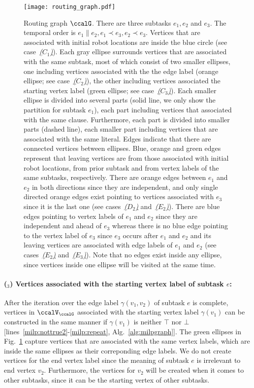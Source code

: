 \documentclass[Afour,sageh,times]{sagej}
\newcounter{mycounter}
\begin{document}
\begin{figure}[!t]
  \centering
  \texttt{[image: routing\_graph.pdf]}
  \caption{Routing graph $\ccalG$. There are three subtasks $e_1, e_2$ and $e_3$. The temporal order is $e_1 \| e_2, e_1 \prec e_3, e_2 \prec e_3$.    Vertices that are associated with initial robot locations are inside the blue circle (see case~\hyperref[vertex:initial]{\it ($C_1$)}). Each gray ellipse surrounds vertices that are associated with the same subtask, most of which consist of two smaller ellipses, one including vertices associated with the the edge label (orange ellipse; see case~\hyperref[vertex:edge]{\it ($C_2$)}), the other including vertices associated the starting vertex label (green ellipse; see case~\hyperref[vertex:vertex]{\it ($C_3$)}).  Each smaller ellipse is divided into several parts (solid line, we only show the partition for subtask $e_1$), each part including vertices that associated with the same clause. Furthermore, each part is divided into smaller parts (dashed line), each smaller part including vertices that are associated with the same literal.
    Edges indicate that there are connected vertices between  ellipses. Blue, orange and green  edges represent that leaving vertices are from those associated with initial robot locations, from  prior subtask and from vertex labels of the same subtasks, respectively. There are orange edges between $e_1$ and $e_2$ in both directions since they are independent, and only single directed orange edges exist pointing to vertices associated with $e_3$ since it is the last one {(see cases~\hyperref[sec:b]{\it ($D_2$)} and~\hyperref[edge:vertex2]{\it ($E_2$)})}. There are blue edges pointing to vertex labels of $e_1$ and $e_2$ since they are independent and ahead of $e_3$  whereas there is no blue edge pointing to the vertex label of $e_3$ since $e_3$ occurs after $e_1$ and $e_2$ and its leaving vertices are associated with  edge labels of $e_1$ and $e_2$ (see cases~\hyperref[edge:vertex2]{\it ($E_2$)} and~\hyperref[edge:vertex3]{\it ($E_3$)}).  Note that no edges exist inside any ellipse, since vertices inside one ellipse will be visited at the same time.}
  \label{fig:routing}
\end{figure}
\paragraph{($_3$) Vertices associated with the starting vertex label of subtask $e$:}\label{vertex:vertex} After the iteration over the edge label $\gamma(v_1, v_2)$ of subtask $e$ is complete, vertices in $\ccalV_\ccalG$ associated with the starting  vertex label $\gamma(v_1)$ can be constructed in the same manner if $\gamma(v_1)$ is neither $\top$ nor $\bot$ [lines~\ref{milp:nottrue2}-\ref{milp:repeat}, Alg.~\ref{alg:milpgraph}]. The green ellipses in Fig.~\ref{fig:routing} capture vertices that are associated with the same vertex labels, which are inside the same ellipses as their correponding edge labels. We do not create vertices for the end vertex label since the meaning of subtask $e$ is irrelevant to end vertex $v_2$. Furthermore, the vertices for $v_2$ will be created when it comes to other subtasks, since it can be the starting vertex of other subtasks.
\end{document}
